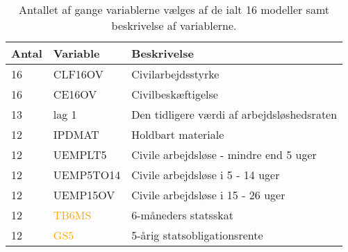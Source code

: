 \begin{table}[ht] 
\centering 
\begin{tabular}{lll}
\toprule 
Antal & Variable & Beskrivelse \\ \midrule
16 &\textcolor{blue3}{CLF16OV} & Civilarbejdsstyrke \\
16 &\textcolor{blue3}{CE16OV} & Civilbeskæftigelse \\
13 & \textcolor{blue3}{lag 1} & Den tidligere værdi af arbejdsløshedsraten \\
12 & \textcolor{chartreuse4}{IPDMAT} & Holdbart materiale  \\
12 & \textcolor{blue3}{UEMPLT5} & Civile arbejdsløse - mindre end 5 uger \\
12 & \textcolor{blue3}{UEMP5TO14}& Civile arbejdsløse i 5 - 14 uger \\
12 & \textcolor{blue3}{UEMP15OV} &  Civile arbejdsløse i 15 - 26 uger  \\
12 & \textcolor{orange}{TB6MS} & 6-måneders statsskat  \\
12 & \textcolor{orange}{GS5} & 5-årig statsobligationsrente \\
\bottomrule
\end{tabular}  
\caption{Antallet af gange variablerne vælges af de ialt 16 modeller samt beskrivelse af variablerne.} \label{tab:topvariable}
\end{table} 